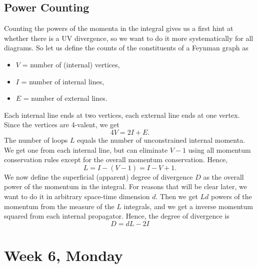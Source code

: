 \documentclass[12pt]{article}
\begin{document}
\subsection{Power Counting}

Counting the powers of the momenta in the integral gives us a first
hint at whether there is a UV divergence, so we want to do it more
systematically for all diagrams. So let us define the counts of the
constituents of a Feynman graph as
\begin{itemize}
\item $V$ = number of (internal) vertices,
\item $I$ = number of internal lines,
\item $E$ = number of external lines.
\end{itemize}
Each internal line ends at two vertices, each external line ends at
one vertex. Since the vertices are 4-valent, we get
\begin{equation}
  4V = 2I + E.
\end{equation}
The number of loops $L$ equals the number of unconstrained internal
momenta. We get one from each internal line, but can eliminate $V-1$
using all momentum conservation rules except for the overall momentum
conservation. Hence,
\begin{equation}
  L = I - (V-1) = I - V + 1.
\end{equation}
We now define the superficial (apparent) degree of divergence $D$ as
the overall power of the momentum in the integral. For reasons that
will be clear later, we want to do it in arbitrary space-time
dimension $d$. Then we get $Ld$ powers of the momentum from the
measure of the $L$ integrals, and we get a inverse momentum squared
from each internal propagator. Hence, the degree of divergence is
\begin{equation}
  D = dL - 2I
\end{equation}







\section{Week 6, Monday}
\end{document}
